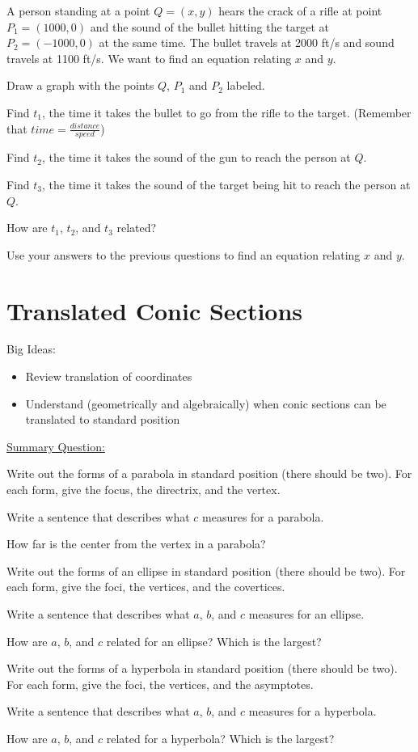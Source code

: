 \bq A person standing at a point $Q=(x,y)$ hears the crack of a rifle at point $P_1= (1000,0)$ and the sound of the bullet hitting the target at $P_2=(-1000,0)$ at the same time. The bullet travels at 2000 ft/s and sound travels at 1100 ft/s. We want to find an equation relating $x$ and $y$.
\be
\item Draw a graph with the points $Q$, $P_1$ and $P_2$ labeled.
\item Find $t_1$, the time it takes the bullet to go from the rifle to the target. (Remember that $time = \frac{distance}{speed}$)
\item Find $t_2$, the time it takes the sound of the gun to reach the person at $Q$.
\item Find $t_3$, the time it takes the sound of the target being hit to reach the person at $Q$.
\item How are $t_1$, $t_2$, and $t_3$ related?
\item Use your answers to the previous questions to find an equation relating $x$ and $y$.
\ee
\eq

\section{Translated Conic Sections}
Big Ideas:
\begin{itemize}
\item Review translation of coordinates
\item Understand (geometrically and algebraically) when conic sections can be translated to standard position
\end{itemize}

\bq \label{q32} \underline{Summary Question:}

\be
\item Write out the forms of a parabola in standard position (there should be two). For each form, give the focus, the directrix, and the vertex.
\item Write a sentence that describes what $c$ measures for a parabola.
\item How far is the center from the vertex in a parabola?
\item Write out the forms of an ellipse in standard position (there should be two). For each form, give the foci, the vertices, and the covertices.
\item Write a sentence that describes what $a$, $b$, and $c$ measures for an ellipse.
\item How are $a$, $b$, and $c$ related for an ellipse? Which is the largest?
\item Write out the forms of a hyperbola in standard position (there should be two). For each form, give the foci, the vertices, and the asymptotes.
\item Write a sentence that describes what $a$, $b$, and $c$ measures for a hyperbola.
\item How are $a$, $b$, and $c$ related for a hyperbola? Which is the largest?
\ee \eq

